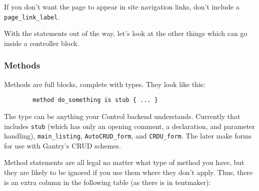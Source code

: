 If you don't want the page to appear in site navigation links, don't include
a \verb+page_link_label+.

With the statements out of the way, let's look at the other things which
can go inside a controller block.

\subsubsection*{Methods}

Methods are full blocks, complete with types.  They look like this:

\begin{verbatim}
        method do_something is stub { ... }
\end{verbatim}

The type can be anything your Control backend understands.  Currently that
includes \verb+stub+ (which has only an opening comment, a declaration,
and parameter handling), \verb+main_listing+, \verb+AutoCRUD_form+, and
\verb+CRDU_form+.  The later make forms for use with Gantry's CRUD schemes.

Method statements are all legal no matter what type of method you have,
but they are likely to be ignored if you use them where they don't apply.
Thus, there is an extra column in the following table (as there is in
tentmaker):

